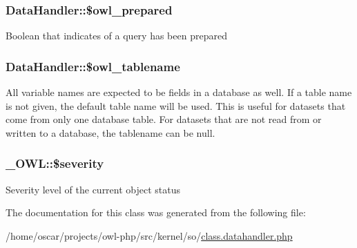 \subsubsection[{\$owl\_\-prepared}]{\setlength{\rightskip}{0pt plus 5cm}DataHandler::\$owl\_\-prepared}\label{classDataHandler_ae6093d21291ed3ab3183e11962452928}
Boolean that indicates of a query has been prepared 
\subsubsection[{\$owl\_\-tablename}]{\setlength{\rightskip}{0pt plus 5cm}DataHandler::\$owl\_\-tablename}\label{classDataHandler_a24620784bde262bdd02227962d3b9605}
All variable names are expected to be fields in a database as well. If a table name is not given, the default table name will be used. This is useful for datasets that come from only one database table. For datasets that are not read from or written to a database, the tablename can be null. 
\subsubsection[{\$severity}]{\setlength{\rightskip}{0pt plus 5cm}\_\-OWL::\$severity}\label{class__OWL_ad26b40a9dbbacb33e299b17826f8327c}
Severity level of the current object status 

The documentation for this class was generated from the following file:\begin{DoxyCompactItemize}
\item 
/home/oscar/projects/owl-\/php/src/kernel/so/\hyperlink{class_8datahandler_8php}{class.datahandler.php}\end{DoxyCompactItemize}

